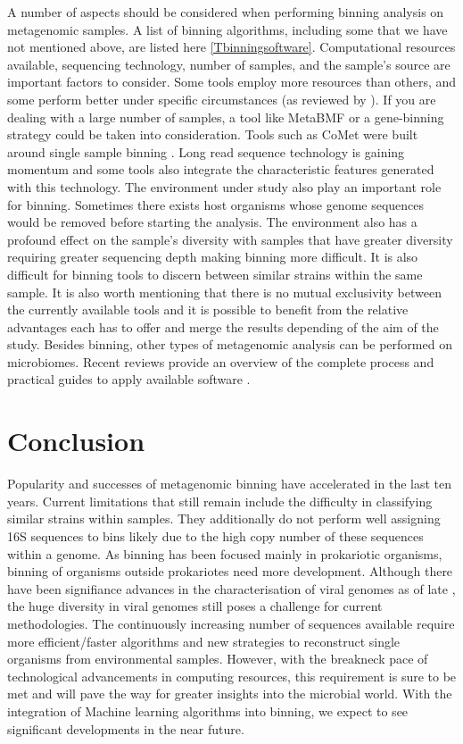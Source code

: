 \documentclass{article}
\begin{document}
A number of aspects should be considered when performing binning analysis on metagenomic samples.
A list of binning algorithms, including some that we have not mentioned above, are listed here \autoref{Tbinningsoftware}.
Computational resources available, sequencing technology, number of samples, and the sample's source are important factors to consider.
Some tools employ more resources than others, and some perform better under specific circumstances (as reviewed by ).
If you are dealing with a large number of samples, a tool like MetaBMF \cite{Xing2017MetaGen, Ma2019MetaBMF} or a gene-binning strategy could be taken into consideration.
Tools such as CoMet were built around single sample binning \cite{herath2017comet}.
Long read sequence technology is gaining momentum and some tools also integrate the characteristic features generated with this technology.
The environment under study also play an important role for binning.
Sometimes there exists host organisms whose genome sequences would be removed before starting the analysis.
The environment also has a profound effect on the sample's diversity with samples that have greater diversity requiring greater sequencing depth making binning more difficult.
It is also difficult for binning tools to discern between similar strains within the same sample.  
It is also worth mentioning that there is no mutual exclusivity between the currently available tools and it is possible to benefit from the relative advantages each has to offer and merge the results depending of the aim of the study.
Besides binning, other types of metagenomic analysis can be performed on microbiomes.
Recent reviews provide an overview of the complete process and practical guides to apply available software \cite{breitwieser2019review}.  

\section{Conclusion}
Popularity and successes of metagenomic binning have accelerated in the last ten years.
Current limitations that still remain include the difficulty in classifying similar strains within samples.
They additionally do not perform well assigning 16S sequences to bins likely due to the high copy number of these sequences within a genome.
As binning has been focused mainly in prokariotic organisms, binning of organisms outside prokariotes need more development.
Although there have been signifiance advances in the characterisation of viral genomes as of late \cite{nayfach2021metagenomic}, the huge diversity in viral genomes still poses a challenge for current methodologies.
The continuously increasing number of sequences available require more efficient/faster algorithms and new strategies to reconstruct single organisms from environmental samples.
However, with the breakneck pace of technological advancements in computing resources, this requirement is sure to be met and will pave the way for greater insights into the microbial world.
With the integration of Machine learning algorithms into binning, we expect to see significant developments in the near future.
\end{document}
